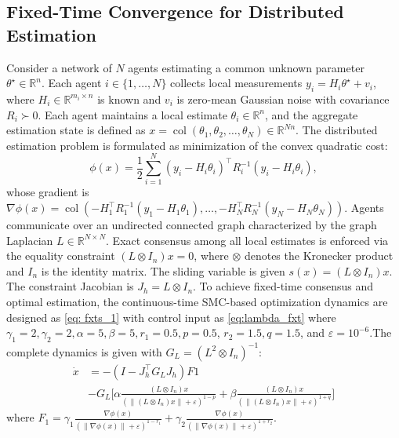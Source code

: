 \documentclass[letterpaper, 10 pt, conference]{ieeeconf}
\begin{document}
\subsection{Fixed-Time Convergence for Distributed Estimation}
Consider a network of $N$ agents estimating a common unknown parameter $\theta^\star \in \mathbb{R}^n$. Each agent $i \in \{1,\dots,N\}$ collects local measurements $ y_i = H_i \theta^\star + v_i$, where $H_i \in \mathbb{R}^{m_i \times n}$ is known and $v_i$ is zero-mean Gaussian noise with covariance $R_i \succ 0$. Each agent maintains a local estimate
$\theta_i \in \mathbb{R}^n$, and the aggregate estimation state is defined as  $x = \operatorname{col}(\theta_1,\theta_2,\dots,\theta_N) \in \mathbb{R}^{Nn}$. The distributed estimation problem is formulated as minimization of the convex quadratic cost:
\begin{equation}
    \phi(x)= \frac{1}{2}\sum_{i=1}^N(y_i - H_i \theta_i)^\top R_i^{-1}(y_i - H_i \theta_i),
\end{equation}
whose gradient is
$\nabla \phi(x)= \operatorname{col}\!\left(-H_1^\top R_1^{-1}(y_1 - H_1\theta_1), \dots,-H_N^\top R_N^{-1}(y_N - H_N\theta_N)\right)$. Agents communicate over an undirected connected graph characterized by the graph Laplacian $L \in \mathbb{R}^{N\times N}$. Exact consensus among all local estimates is enforced via the equality constraint $( L\otimes I_n)x=0$, where $\otimes$ denotes the Kronecker product and $I_n$ is the identity matrix.
The sliding variable is given $s(x)=(L \otimes I_n)x$. The constraint Jacobian is $J_h = L \otimes I_n$. To achieve fixed-time consensus and optimal estimation, the continuous-time SMC-based optimization dynamics are designed as \eqref{eq: fxts_1} with control input as \eqref{eq:lambda_fxt} where $\gamma_1=2,\gamma_2=2,\alpha=5,\beta=5, r_1=0.5, p=0.5$, $r_2=1.5,q=1.5$, and $\varepsilon=10^{-6}$.The complete dynamics is given with $G_L=(L^2 \otimes I_n)^{-1}$:
\begin{equation} \label{eq:complete_closed_loop}
    \begin{aligned}
        \dot{x} &= -(I-J_h^\top G_L J_h)F1\\
        &-G_L \Big[\alpha \frac{(L \otimes I_n)x}{(\|(L \otimes I_n)x\|+\varepsilon)^{1-p}}+ \beta \frac{(L \otimes I_n)x}{(\|(L \otimes I_n)x\|+\varepsilon)^{1+q}}\Big]
    \end{aligned}
\end{equation}
where $F_1=\gamma_1 \frac{\nabla \phi(x)}{(\|\nabla \phi(x)\|+\varepsilon)^{1-r_1}}+ \gamma_2 \frac{\nabla \phi(x)}{(\|\nabla \phi(x)\|+\varepsilon)^{1+r_2}}$.
\end{document}
